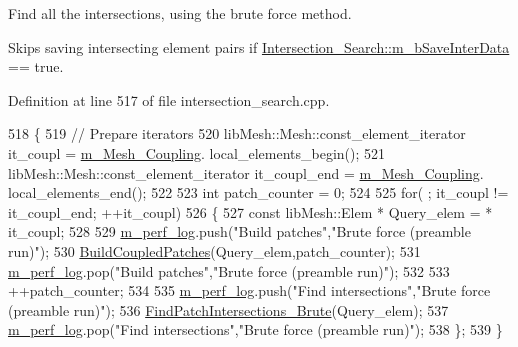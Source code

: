 Find all the intersections, using the brute force method. 

Skips saving intersecting element pairs if \hyperlink{classcarl_1_1_intersection___search_a8f20721814d9dcfab34a0b6c85b88f3c}{Intersection\+\_\+\+Search\+::m\+\_\+b\+Save\+Inter\+Data} == true. 

Definition at line 517 of file intersection\+\_\+search.\+cpp.


\begin{DoxyCode}
518     \{
519         \textcolor{comment}{// Prepare iterators}
520         libMesh::Mesh::const\_element\_iterator it\_coupl = \hyperlink{classcarl_1_1_intersection___search_adb13a40afa6c1f8db7bb33f68c5b42d2}{m\_Mesh\_Coupling}.
      local\_elements\_begin();
521         libMesh::Mesh::const\_element\_iterator it\_coupl\_end = \hyperlink{classcarl_1_1_intersection___search_adb13a40afa6c1f8db7bb33f68c5b42d2}{m\_Mesh\_Coupling}.
      local\_elements\_end();
522 
523         \textcolor{keywordtype}{int} patch\_counter = 0;
524 
525         \textcolor{keywordflow}{for}( ; it\_coupl != it\_coupl\_end; ++it\_coupl)
526         \{
527             \textcolor{keyword}{const} libMesh::Elem * Query\_elem = * it\_coupl;
528 
529             \hyperlink{classcarl_1_1_intersection___search_aebe6210287a36909206b1a59f9cd17e0}{m\_perf\_log}.push(\textcolor{stringliteral}{"Build patches"},\textcolor{stringliteral}{"Brute force (preamble run)"});
530             \hyperlink{classcarl_1_1_intersection___search_a00e012de151310737c771ee7b15c9b2c}{BuildCoupledPatches}(Query\_elem,patch\_counter);
531             \hyperlink{classcarl_1_1_intersection___search_aebe6210287a36909206b1a59f9cd17e0}{m\_perf\_log}.pop(\textcolor{stringliteral}{"Build patches"},\textcolor{stringliteral}{"Brute force (preamble run)"});
532 
533             ++patch\_counter;
534 
535             \hyperlink{classcarl_1_1_intersection___search_aebe6210287a36909206b1a59f9cd17e0}{m\_perf\_log}.push(\textcolor{stringliteral}{"Find intersections"},\textcolor{stringliteral}{"Brute force (preamble run)"});
536             \hyperlink{classcarl_1_1_intersection___search_ad91e556edabe62c1b0b5d30e3fc3bcef}{FindPatchIntersections\_Brute}(Query\_elem);
537             \hyperlink{classcarl_1_1_intersection___search_aebe6210287a36909206b1a59f9cd17e0}{m\_perf\_log}.pop(\textcolor{stringliteral}{"Find intersections"},\textcolor{stringliteral}{"Brute force (preamble run)"});
538         \};
539     \}
\end{DoxyCode}
\hypertarget{classcarl_1_1_intersection___search_a69d44884067e5bb1e63711c66c9c6d89}{}
